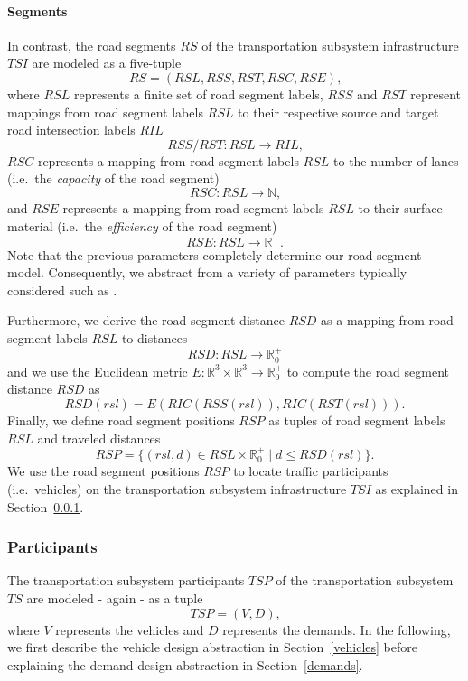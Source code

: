 \paragraph{Segments}
\label{segments}

In contrast, the road segments $RS$ of the transportation subsystem infrastructure $TSI$ are modeled as a five-tuple
\[
	RS = (RSL, RSS, RST, RSC, RSE) \textrm{,}
\]
where $RSL$ represents a finite set of road segment labels, $RSS$ and $RST$ represent mappings from road segment labels $RSL$ to their respective source and target road intersection labels $RIL$
\[
	RSS/RST: RSL \rightarrow RIL \textrm{,}
\]
$RSC$ represents a mapping from road segment labels $RSL$ to the number of lanes (i.e.\ the \textit{capacity} of the road segment)
\[
	RSC: RSL \rightarrow \mathbb{N} \textrm{,}
\]
and $RSE$ represents a mapping from road segment labels $RSL$ to their surface material (i.e.\ the \textit{efficiency} of the road segment)
\[
	RSE: RSL \rightarrow \mathbb{R}^+ \textrm{.}
\]
Note that the previous parameters completely determine our road segment model. Consequently, we abstract from a variety of parameters typically considered such as .

Furthermore, we derive the road segment distance $RSD$ as a mapping from road segment labels $RSL$ to distances
\[
	RSD: RSL \rightarrow \mathbb{R}_0^+
\]
and we use the Euclidean metric $E: \mathbb{R}^3 \times \mathbb{R}^3 \rightarrow \mathbb{R}_0^+$ to compute the road segment distance $RSD$ as
\[
	RSD(rsl) = E(RIC(RSS(rsl)), RIC(RST(rsl))) \textrm{.}
\]
Finally, we define road segment positions $RSP$ as tuples of road segment labels $RSL$ and traveled distances
\[
	RSP = \{(rsl, d) \in RSL \times \mathbb{R}_0^+ \mid d \leq RSD(rsl)\} \textrm{.}
\]
We use the road segment positions $RSP$ to locate traffic participants (i.e.\ vehicles) on the transportation subsystem infrastructure $TSI$ as explained in Section~\ref{participants}.

\subsubsection{Participants}
\label{participants}

The transportation subsystem participants $TSP$ of the transportation subsystem $TS$ are modeled - again - as a tuple
\[
	TSP = (V, D) \textrm{,}
\]
where $V$ represents the vehicles and $D$ represents the demands. In the following, we first describe the vehicle design abstraction in Section~\ref{vehicles} before explaining the demand design abstraction in Section~\ref{demands}.

